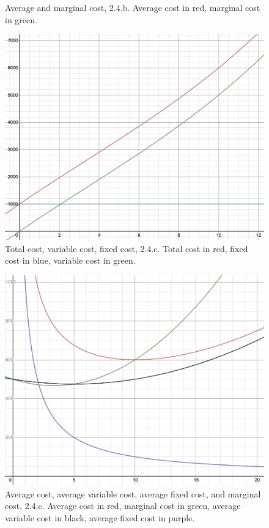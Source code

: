 \documentclass[10pt,letter]{article}
\begin{document}
\begin{itemize}
\begin{figure}
\caption{Average and marginal cost, 2.4.b. Average cost in red, marginal cost in green.}
\end{figure}
\begin{figure}
\centering
\includegraphics[scale=0.4]{ps5fig3}
\caption{Total cost, variable cost, fixed cost, 2.4.c. Total cost in red, fixed cost in blue, variable cost in green.}
\end{figure}
\begin{figure}
\centering
\includegraphics[scale=0.4]{ps5fig4}
\caption{Average cost, average variable cost, average fixed cost, and marginal cost, 2.4.c. Average cost in red, marginal cost in green, average variable cost in black, average fixed cost in purple.}

\end{figure}
\end{itemize}
\end{document}

